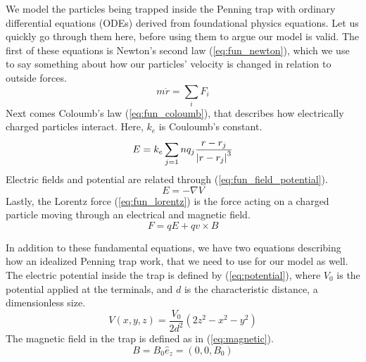 We model the particles being trapped inside the Penning trap with ordinary differential equations (ODEs) derived from foundational physics equations. Let us quickly go through them here, before using them to argue our model is valid. The first of these equations is Newton's second law (\ref{eq:fun_newton}), which we use to say something about how our particles' velocity is changed in relation to outside forces.
%
\begin{equation}
\label{eq:fun_newton}
m \ddot r = \sum_i F_i
\end{equation}
%
Next comes Coloumb's law (\ref{eq:fun_coloumb}), that describes how electrically charged particles interact. Here, $k_e$ is Couloumb's constant.
%
\begin{equation}
\label{eq:fun_coloumb}
E = k_e \sum_{j=1}n q_j \frac{r - r_j}{\abs{r - r_j}^3}
\end{equation}
%
Electric fields and potential are related through (\ref{eq:fun_field_potential}).
\begin{equation}
\label{eq:fun_field_potential}
E = - \nabla V
\end{equation}
%
Lastly, the Lorentz force (\ref{eq:fun_lorentz}) is the force acting on a charged particle moving through an electrical and magnetic field.
%
\begin{equation}
\label{eq:fun_lorentz}
F = qE + qv \times B 
\end{equation}


In addition to these fundamental equations, we have two equations describing how an idealized Penning trap work, that we need to use for our model as well. The electric potential inside the trap is defined by (\ref{eq:potential}), where $V_0$ is the potential applied at the terminals, and $d$ is the characteristic distance, a dimensionless size.
%
\begin{equation}
\label{eq:potential}
V(x, y, z) = \frac{V_0}{2d^2}(2z^2 - x^2 - y^2)
\end{equation}
%
The magnetic field in the trap is defined as in (\ref{eq:magnetic}).
%
\begin{equation}
\label{eq:magnetic}
B = B_0 \hat{e}_z = (0, 0, B_0)
\end{equation}

